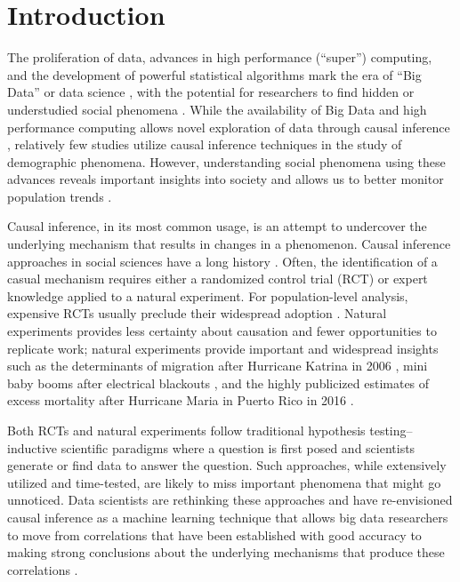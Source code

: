 \documentclass[12pt]{article}
\begin{document}
\newpage
{} %

\newpage

\hypertarget{introduction}{%
\section{Introduction}\label{introduction}}

The proliferation of data, advances in high performance (``super'')
computing, and the development of powerful statistical algorithms mark
the era of ``Big Data'' or data science
\citep{van2016data, zikopoulos2011}, with the potential for researchers
to find hidden or understudied social phenomena
\citep{bohon2018demography}. While the availability of Big Data and high
performance computing allows novel exploration of data through causal
inference
\citep{bohon2018demography, rcausalimpact, shiffrin2016drawing},
relatively few studies utilize causal inference techniques in the study
of demographic phenomena. However, understanding social phenomena using
these advances reveals important insights into society
\citep{angrist1989lifetime, mas2009peers} and allows us to better
monitor population trends \citep{nobles2019, torche2015hidden}.

Causal inference, in its most common usage, is an attempt to undercover the underlying mechanism that results in changes in a phenomenon. Causal inference approaches in social sciences have a long history
\citep{grimmer2015ppsp}. Often, the identification of a casual mechanism
requires either a randomized control trial (RCT) or expert knowledge
applied to a natural experiment. For population-level analysis,
expensive RCTs usually preclude their widespread adoption
\citep{west2008ajph}. Natural experiments provides less certainty about causation and fewer opportunities to replicate work; natural experiments provide
important and widespread insights such as the determinants of migration
after Hurricane Katrina in 2006
\citep{fussellRecoveryMigrationCity2014, horiDisplacementDynamicsSouthern2009},
mini baby booms after electrical blackouts \citep{fetzer2018jpe}, and
the highly publicized estimates of excess mortality after Hurricane
Maria in Puerto Rico in 2016
\citep{kishore2018mortality, santos2018use}. 

Both RCTs and natural
experiments follow traditional hypothesis testing--inductive scientific
paradigms where a question is first posed and scientists generate or
find data to answer the question. Such approaches, while extensively
utilized and time-tested, are likely to miss important phenomena that
might go unnoticed. Data scientists are rethinking these approaches and have re-envisioned causal inference as a machine learning technique that allows big data researchers to move from correlations that have been established with good accuracy to making strong conclusions about the underlying mechanisms that produce these correlations
\citep{Pearl2018}.
\end{document}
